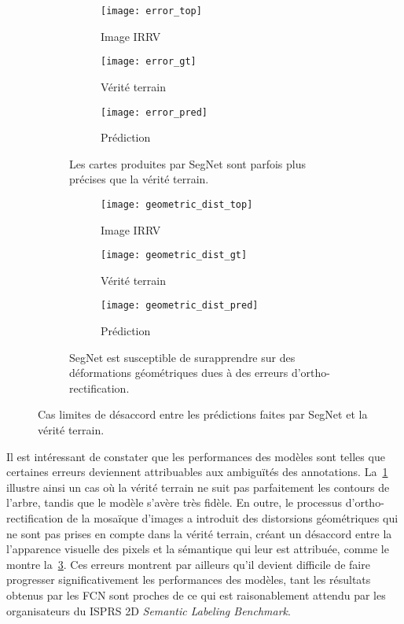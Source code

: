\begin{figure}[h]
	\captionsetup[subfigure]{singlelinecheck=off,justification=centering}
	\begin{subfigure}{0.5\textwidth}
		\begin{subfigure}[t]{0.3\textwidth}
	    	\texttt{[image: error\_top]}
	        \caption*{Image \gls{IRRV}}
	    \end{subfigure}
	    \begin{subfigure}[t]{0.3\textwidth}
	    	\texttt{[image: error\_gt]}
	        \caption*{Vérité terrain}
	    \end{subfigure}
	    \begin{subfigure}[t]{0.3\textwidth}
	    	\texttt{[image: error\_pred]}
	        \caption*{Prédiction}
	    \end{subfigure}
	    \caption{Les cartes produites par SegNet sont parfois plus précises que la vérité terrain.}
	    \label{fig:unprecise_transition}
	\end{subfigure}
	\begin{subfigure}{0.5\textwidth}
		\begin{subfigure}[t]{0.3\textwidth}
	    	\texttt{[image: geometric\_dist\_top]}
	        \caption*{Image \gls{IRRV}}
	    \end{subfigure}
	    \begin{subfigure}[t]{0.3\textwidth}
	    	\texttt{[image: geometric\_dist\_gt]}
	        \caption*{Vérité terrain}
	    \end{subfigure}
	    \begin{subfigure}[t]{0.3\textwidth}
	    	\texttt{[image: geometric\_dist\_pred]}
	        \caption*{Prédiction}
	    \end{subfigure}
	    \caption{SegNet est susceptible de surapprendre sur des déformations géométriques dues à des erreurs d'ortho-rectification.}
	    \label{fig:geometric_dist}
	\end{subfigure}
	\caption{Cas limites de désaccord entre les prédictions faites par SegNet et la vérité terrain.\\
	\isprslegende}
\end{figure}

Il est intéressant de constater que les performances des modèles sont telles que certaines erreurs deviennent attribuables aux ambiguïtés des annotations. La~\cref{fig:unprecise_transition} illustre ainsi un cas où la vérité terrain ne suit pas parfaitement les contours de l'arbre, tandis que le modèle s'avère très fidèle. En outre, le processus d'ortho-rectification de la mosaïque d'images a introduit des distorsions géométriques qui ne sont pas prises en compte dans la vérité terrain, créant un désaccord entre la l'apparence visuelle des pixels et la sémantique qui leur est attribuée, comme le montre la~\cref{fig:geometric_dist}. Ces erreurs montrent par ailleurs qu'il devient difficile de faire progresser significativement les performances des modèles, tant les résultats obtenus par les \gls{FCN} sont proches de ce qui est raisonablement attendu par les organisateurs du \gls{ISPRS} 2D \emph{Semantic Labeling Benchmark}.

